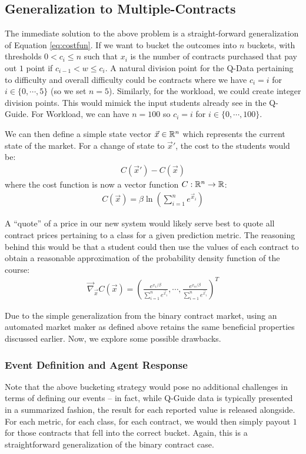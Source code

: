 \subsection{Generalization to Multiple-Contracts}
\label{sec:general_market_maker}
The immediate solution to the above problem is a straight-forward generalization of Equation \ref{eq:costfun}. If we want to bucket the outcomes into $n$ buckets, with thresholds $ 0< c_i \leq n$ such that $x_i$ is the number of contracts purchased that pay out $1$ point if $c_{i-1}< w \le c_{i}$. A natural division point for the Q-Data pertaining to difficulty and overall difficulty could be contracts where we have $c_i = i$ for $i \in \{0, \cdots,5\}$ (so we set $n=5$). Similarly, for the workload, we could create integer division points. This would mimick the input students already see in the Q-Guide. For Workload, we can have $n = 100$ so $c_i = i$ for $i \in \{0,\cdots,100 \}$.

We can then define a simple state vector $\vec{x} \in \mathbb{R}^n$ which represents the current state of the market. For a change of state to $\vec{x}'$, the cost to the students would be:
\begin{align}
C(\vec{x}') - C(\vec{x})
\end{align}
where the cost function is now a vector function $C: \mathbb{R}^n \to \mathbb{R}$:
\begin{align}
C(\vec{x}) = \beta \ln \left(\sum_{i=1}^{n} e^{\vec{x}_i}\right)
\end{align}

A ``quote'' of a price in our new system would likely serve best to quote all contract prices pertaining to a class for a given prediction metric. The reasoning behind this would be that a student could then use the values of each contract to obtain a reasonable approximation of the probability density function of the course:
\begin{align}
 	\vec\nabla_{\vec{x}} C(\vec{x}) = \left(\frac{e^{x_1/\beta}}{\sum_{i=1}^{n}e^{\vec{x}_i}}, \cdots, \frac{e^{x_n/\beta}}{\sum_{i=1}^{n}e^{\vec{x}_i}}\right)^T
\end{align}

Due to the simple generalization from the binary contract market, using an automated market maker as defined above retains the same beneficial properties discussed earlier. Now, we explore some possible drawbacks.

\subsubsection{Event Definition and Agent Response}
Note that the above bucketing strategy would pose no additional challenges in terms of defining our events -- in fact, while Q-Guide data is typically presented in a summarized fashion, the result for each reported value is released alongside. For each metric, for each class, for each contract, we would then simply payout $1$ for those contracts that fell into the correct bucket. Again, this is a straightforward generalization of the binary contract case.

